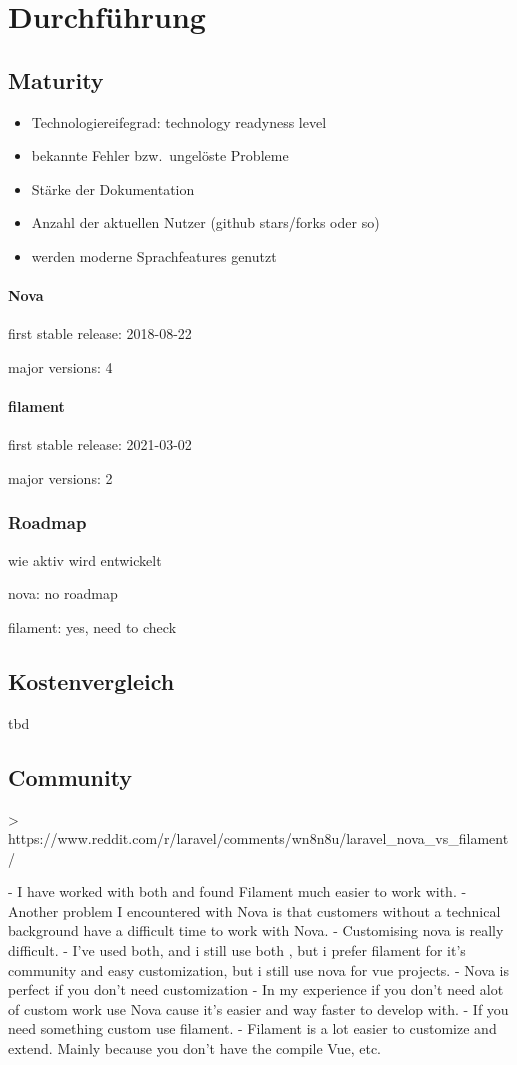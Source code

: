 \section{Durchführung}

\subsection{Maturity}
\begin{itemize}
    \item Technologiereifegrad: technology readyness level
    \item bekannte Fehler bzw.\ ungelöste Probleme
    \item Stärke der Dokumentation
    \item Anzahl der aktuellen Nutzer (github stars/forks oder so)
    \item werden moderne Sprachfeatures genutzt
\end{itemize}

\paragraph{Nova}
first stable release: 2018-08-22

major versions: 4

\paragraph{filament}
first stable release: 2021-03-02

major versions: 2

\subsubsection{Roadmap}
wie aktiv wird entwickelt

nova: no roadmap

filament: yes, need to check

\subsection{Kostenvergleich}
tbd

\subsection{Community}
> https://www.reddit.com/r/laravel/comments/wn8n8u/laravel_nova_vs_filament/

- I have worked with both and found Filament much easier to work with.
- Another problem I encountered with Nova is that customers without a technical background have a difficult time to work
with Nova.
- Customising nova is really difficult.
- I've used both, and i still use both , but i prefer filament for it's community and easy customization, but i still
use nova for vue projects.
- Nova is perfect if you don't need customization
- In my experience if you don’t need alot of custom work use Nova cause it’s easier and way faster to develop with.
- If you need something custom use filament.
- Filament is a lot easier to customize and extend. Mainly because you don’t have the compile Vue, etc.

